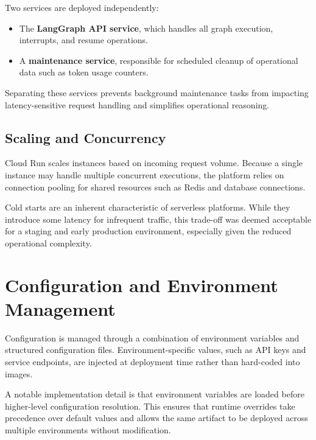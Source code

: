Two services are deployed independently:

\begin{itemize}
      \item The \textbf{LangGraph API service}, which handles all graph execution,
            interrupts, and resume operations.
      \item A \textbf{maintenance service}, responsible for scheduled cleanup of
            operational data such as token usage counters.
\end{itemize}

Separating these services prevents background maintenance tasks from impacting
latency-sensitive request handling and simplifies operational reasoning.

\subsection{Scaling and Concurrency}
\label{sec:ScalingConcurrency}

Cloud Run scales instances based on incoming request volume. Because a single
instance may handle multiple concurrent executions, the platform relies on
connection pooling for shared resources such as Redis and database connections.

Cold starts are an inherent characteristic of serverless platforms. While they
introduce some latency for infrequent traffic, this trade-off was deemed
acceptable for a staging and early production environment, especially given
the reduced operational complexity.

\section{Configuration and Environment Management}
\label{sec:ConfigManagement}

Configuration is managed through a combination of environment variables and
structured configuration files. Environment-specific values, such as API keys
and service endpoints, are injected at deployment time rather than hard-coded
into images.

A notable implementation detail is that environment variables are loaded
before higher-level configuration resolution. This ensures that runtime
overrides take precedence over default values and allows the same artifact to
be deployed across multiple environments without modification.

